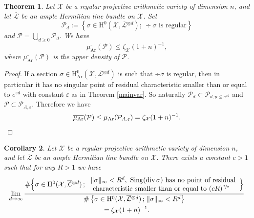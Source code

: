 \documentclass[11pt]{article}
\numberwithin{equation}{section}
\newcommand{\sep}{\,;\,}
\theoremstyle{plain}
\newtheorem{thm}{Theorem}[section]
\newtheorem{cor}[thm]{Corollary}
\theoremstyle{definition}
\newcommand{\ho}{\mathrm{H}}
\newcommand{\X}{\mathcal{X}}
\newcommand{\Li}{\overline{\mathcal{L}}{}}
\begin{document}
\begin{thm}\label{regular}
Let $\X$ be a regular projective arithmetic variety of dimension $n$, and let $\Li$ be an ample Hermitian line bundle on $\X$. Set
\[
\mathcal{P}_{d}:=\left\{ \sigma\in \ho^0(\X,\Li^{\otimes d});\
\div \sigma \text{ is regular} \right\}
\]
and $\mathcal{P}=\bigcup_{d\geq 0} \mathcal{P}_{d}$. We have
\[
\overline{\mu_{\mathrm{Ar}}}(\mathcal{P})\leq\zeta_{\X}(1+n)^{-1},
\]
where $\overline{\mu_{\mathrm{Ar}}}(\mathcal{P})$ is the upper density of $\mathcal{P}$.
\end{thm}
\begin{proof}[Proof]
If a section $ \sigma\in \ho_{\mathrm{Ar}}^0(\X,\Li^{\otimes d})$ is such that $\div \sigma$ is regular, then in particular it has no singular point of residual characteristic smaller than or equal to $e^{\varepsilon d}$ with constant $\varepsilon$ as in Theorem \ref{mainvar}. So naturally $\mathcal{P}_d\subset \mathcal{P}_{d, p\leq e^{\varepsilon d}}$ and $\mathcal{P}\subset \mathcal{P}_{A,\varepsilon}$. Therefore we have
\[
\overline{\mu_{\mathrm{Ar}}}(\mathcal{P})\leq \mu_{\mathrm{Ar}}(\mathcal{P}_{A,\varepsilon})=\zeta_{\X}(1+n)^{-1}.\qedhere
\]
\end{proof}

\begin{cor}\label{singR}
Let $\X$ be a regular projective arithmetic variety of dimension $n$, and let $\Li$ be an ample Hermitian line bundle on $\X$.
There exists a constant $c>1$ such that for any $R>1$ we have
\begin{multline*}
\lim_{d\to \infty}\frac{\#\Bigl\{ \sigma\in \ho^0(\X, \Li^{\otimes d})\sep \begin{array}{ll} \lVert \sigma \rVert_{\infty}<R^d,\ \mathrm{Sing}(\div \sigma) \text{ has no point of residual} \\ \text{ characteristic smaller than or equal to } (cR)^{\sfrac{d}{2}} \end{array}\Bigr\}}{\#\left\{ \sigma\in \ho^0(\X, \Li^{\otimes d})\sep \lVert \sigma \rVert_{\infty}<R^d \right\}}\\
=\zeta_{\X}(1+n)^{-1}.
\end{multline*}
\end{cor}
\end{document}
